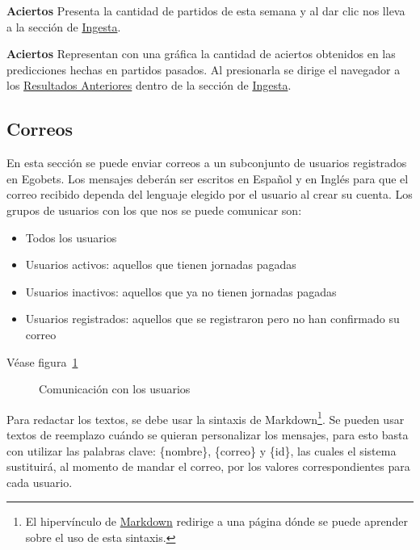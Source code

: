 \textbf{Aciertos}
Presenta la cantidad de partidos de esta semana y al dar clic nos lleva a la sección de \underline{Ingesta}.

\textbf{Aciertos}
Representan con una gráfica la cantidad de aciertos obtenidos en las predicciones hechas en partidos pasados. Al presionarla se dirige el navegador a los \underline{Resultados Anteriores} dentro de la sección de \underline{Ingesta}.

\subsection{Correos}

En esta sección se puede enviar correos a un subconjunto de usuarios registrados en Egobets. Los mensajes deberán ser escritos en Español y en Inglés para que el correo recibido dependa del lenguaje elegido por el usuario al crear su cuenta. Los grupos de usuarios con los que nos se puede comunicar son:

\begin{itemize}
	\item Todos los usuarios
	\item Usuarios activos: aquellos que tienen jornadas pagadas
	\item Usuarios inactivos: aquellos que ya no tienen jornadas pagadas
	\item Usuarios registrados: aquellos que se registraron pero no han confirmado su correo
\end{itemize}
Véase figura~\ref{Fig:correos}

\begin{figure}[!htb]\centering
   \begin {minipage}{0.8\textwidth}
     \caption{Comunicación con los usuarios}
	 \label{Fig:correos}
   \end{minipage}
\end{figure}

Para redactar los textos, se debe usar la sintaxis de Markdown\footnote{El hipervínculo de \underline{Markdown} redirige a una página dónde se puede aprender sobre el uso de esta sintaxis.}.
Se pueden usar textos de reemplazo cuándo se quieran personalizar los mensajes, para esto basta con utilizar las palabras clave: \{nombre\}, \{correo\} y \{id\}, las cuales el sistema sustituirá, al momento de mandar el correo, por los valores correspondientes para cada usuario.




